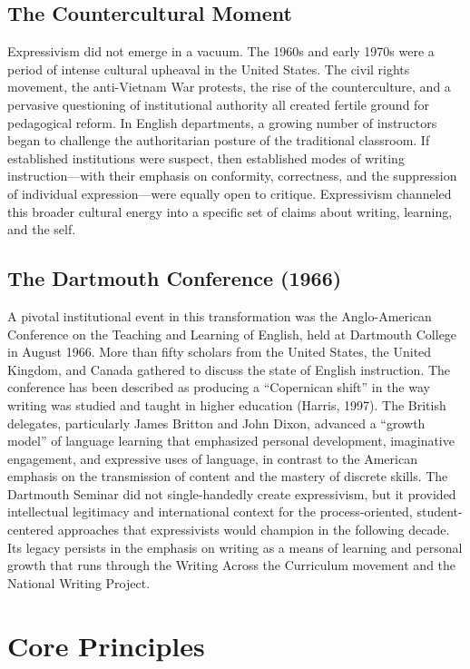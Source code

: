 \documentclass[12pt]{article}
\begin{document}
\subsection{The Countercultural Moment}

Expressivism did not emerge in a vacuum. The 1960s and early 1970s were a period of intense cultural upheaval in the United States. The civil rights movement, the anti-Vietnam War protests, the rise of the counterculture, and a pervasive questioning of institutional authority all created fertile ground for pedagogical reform. In English departments, a growing number of instructors began to challenge the authoritarian posture of the traditional classroom. If established institutions were suspect, then established modes of writing instruction---with their emphasis on conformity, correctness, and the suppression of individual expression---were equally open to critique. Expressivism channeled this broader cultural energy into a specific set of claims about writing, learning, and the self.

\subsection{The Dartmouth Conference (1966)}

A pivotal institutional event in this transformation was the Anglo-American Conference on the Teaching and Learning of English, held at Dartmouth College in August 1966. More than fifty scholars from the United States, the United Kingdom, and Canada gathered to discuss the state of English instruction. The conference has been described as producing a ``Copernican shift'' in the way writing was studied and taught in higher education (Harris, 1997). The British delegates, particularly James Britton and John Dixon, advanced a ``growth model'' of language learning that emphasized personal development, imaginative engagement, and expressive uses of language, in contrast to the American emphasis on the transmission of content and the mastery of discrete skills. The Dartmouth Seminar did not single-handedly create expressivism, but it provided intellectual legitimacy and international context for the process-oriented, student-centered approaches that expressivists would champion in the following decade. Its legacy persists in the emphasis on writing as a means of learning and personal growth that runs through the Writing Across the Curriculum movement and the National Writing Project.

\section{Core Principles}
\end{document}
